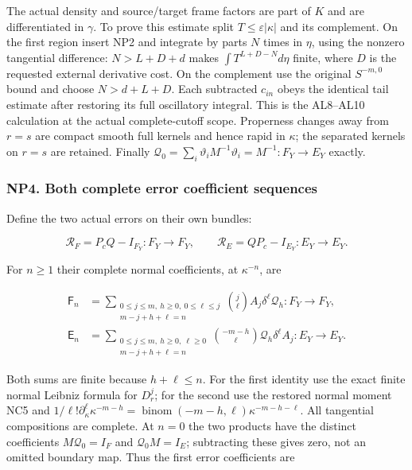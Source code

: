 \documentclass[
  11pt,
]{article}
\begin{document}
The actual density and source/target frame factors are part of \(K\) and
are differentiated in \(\gamma \). To prove this estimate split
\(T\le \varepsilon |\kappa |\) and its complement. On the first region
insert NP2 and integrate by parts \(N\) times in \(\eta \), using the
nonzero tangential difference: \(N>L+D+d\) makes \(\int T^{L+D-N}d\eta \)
finite, where \(D\) is the requested external derivative cost. On the
complement use the original \(S^{-m,0}\) bound and choose \(N>d+L+D\).
Each subtracted \(c_{in}\) obeys the identical tail estimate after
restoring its full oscillatory integral. This is the AL8--AL10
calculation at the actual complete-cutoff scope. Properness changes away
from \(r=s\) are compact smooth full kernels and hence rapid in
\(\kappa \); the separated kernels on \(r=s\) are retained. Finally
\(\mathcal Q _0=\sum _i\vartheta _i M^{-1}\vartheta _i=M^{-1}:F_Y\to E_Y\)
exactly.

\subsubsection{NP4. Both complete error coefficient
sequences}\label{np4.-both-complete-error-coefficient-sequences}

Define the two actual errors on their own bundles:

\[
 \mathcal R_F=P_cQ-I_{F_Y}:F_Y\to F_Y,
 \qquad \mathcal R_E=QP_c-I_{E_Y}:E_Y\to E_Y.
 \tag{NP4}
\]

For \(n\ge1\) their complete normal coefficients, at \(\kappa ^{-n}\),
are

\[
 \begin{aligned}
 \mathsf F_n&=
 \sum_{\substack{0\le j\le m,\ h\ge0,\ 0\le\ell\le j\\m-j+h+\ell=n}}
       \binom j\ell A_j\delta^\ell\mathcal Q_h:F_Y\to F_Y,\\
 \mathsf E_n&=
 \sum_{\substack{0\le j\le m,\ h\ge0,\ \ell\ge0\\m-j+h+\ell=n}}
       \binom{-m-h}\ell\mathcal Q_h\delta^\ell A_j:E_Y\to E_Y.
 \end{aligned}
 \tag{NP5}
\]

Both sums are finite because \(h+\ell \le n\). For the first identity
use the exact finite normal Leibniz formula for \(D_r^j\); for the
second use the restored normal moment NC5 and
\(1/\ell !\partial _\kappa ^\ell \kappa ^{-m-h}=\operatorname{binom}(-m-h,\ell )\kappa ^{-m-h-\ell }\).
All tangential compositions are complete. At \(n=0\) the two products
have the distinct coefficients \(M\mathcal Q _0=I_F\) and
\(\mathcal Q _0M=I_E\); subtracting these gives zero, not an omitted
boundary map. Thus the first error coefficients are
\end{document}
